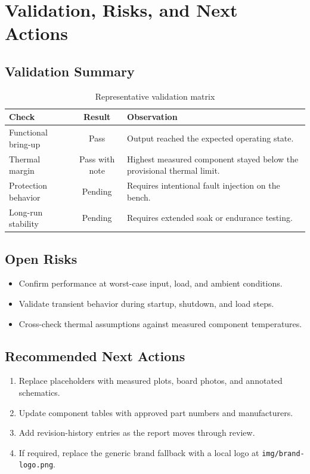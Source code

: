 \section{Validation, Risks, and Next Actions}

\subsection{Validation Summary}
\begin{table}[H]
    \centering
    \small
    \begin{tabular}{l c p{7cm}}
        \toprule
        \textbf{Check} & \textbf{Result} & \textbf{Observation} \\
        \midrule
        Functional bring-up & Pass & Output reached the expected operating state. \\
        Thermal margin & Pass with note & Highest measured component stayed below the provisional thermal limit. \\
        Protection behavior & Pending & Requires intentional fault injection on the bench. \\
        Long-run stability & Pending & Requires extended soak or endurance testing. \\
        \bottomrule
    \end{tabular}
    \caption{Representative validation matrix}
    \label{tab:validation}
\end{table}

\subsection{Open Risks}

\begin{itemize}
    \item Confirm performance at worst-case input, load, and ambient conditions.
    \item Validate transient behavior during startup, shutdown, and load steps.
    \item Cross-check thermal assumptions against measured component temperatures.
\end{itemize}

\subsection{Recommended Next Actions}
\begin{enumerate}
    \item Replace placeholders with measured plots, board photos, and annotated schematics.
    \item Update component tables with approved part numbers and manufacturers.
    \item Add revision-history entries as the report moves through review.
    \item If required, replace the generic brand fallback with a local logo at \texttt{img/brand-logo.png}.
\end{enumerate}

